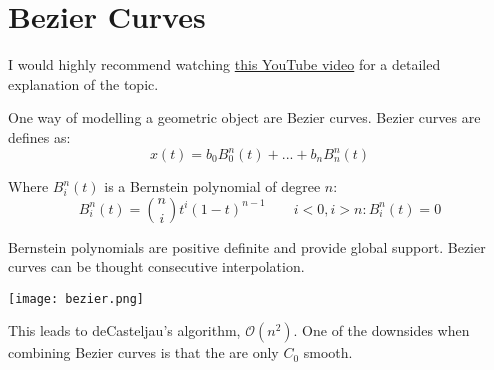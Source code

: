 \section{Bezier Curves}

I would highly recommend watching \href{https://www.youtube.com/watch?v=jvPPXbo87ds&t=2384s}{this YouTube video} for a detailed explanation of the topic. \medskip

One way of modelling a geometric object are Bezier curves. Bezier curves are defines as:
$$x(t) = b_0 B_0^n(t) + ... + b_n B_n^n(t)$$

Where $B_i^n(t)$ is a Bernstein polynomial of degree $n$:
$$B_i^n(t) = {n \choose i} t^i (1-t)^{n-1} \qquad i < 0, i > n: B_i^n(t) = 0$$

Bernstein polynomials are positive definite and provide global support. Bezier curves can be thought consecutive interpolation. 
\begin{center}
	\texttt{[image: bezier.png]}
\end{center}

This leads to deCasteljau's algorithm, $\mathcal O (n^2)$. One of the downsides when combining Bezier curves is that the are only $C_0$ smooth.
